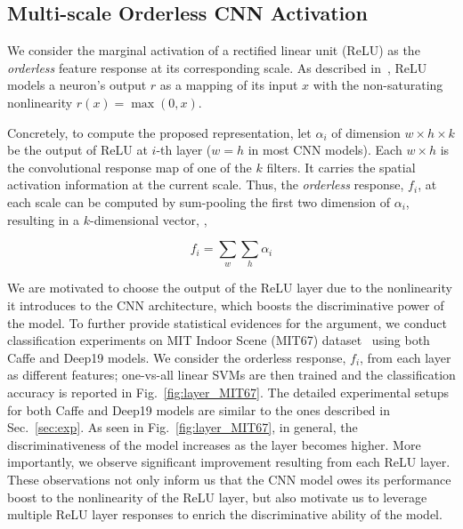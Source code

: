 \documentclass[10pt,twocolumn,letterpaper]{article}
\begin{document}
\subsection{Multi-scale Orderless CNN Activation\label{sec:definition}}

We consider the marginal activation of a rectified linear unit (ReLU) as the \textit{orderless} feature response at its corresponding scale. As described in~\cite{ReLU,AlexNet}, ReLU models a neuron's output $r$ as a mapping of its input $x$ with the non-saturating nonlinearity $r(x)=\max (0,x)$. 

Concretely, to compute the proposed representation, let $\alpha_i$ of dimension $w\times h\times k$ be the output of ReLU at $i$-th layer ($w=h$ in most CNN models). Each $w\times h$ is the convolutional response map of one of the $k$ filters. It carries the spatial activation information at the current scale. Thus, the \textit{orderless} response, $f_i$, at each scale can be computed by sum-pooling the first two dimension of $\alpha_i$, resulting in a $k$-dimensional vector, \ie,

\begin{equation}
f_i=\sum_w \sum_h \alpha_i
\end{equation}

We are motivated to choose the output of the ReLU layer due to the nonlinearity it introduces to the CNN architecture, which boosts the discriminative power of the model. To further provide statistical evidences for the argument, we conduct classification experiments on MIT Indoor Scene (MIT67) dataset~\cite{MIT67} using both Caffe and Deep19 models. We consider the orderless response, $f_i$, from each layer as different features; one-vs-all linear SVMs are then trained and the classification accuracy is reported in Fig.~\ref{fig:layer_MIT67}. The detailed experimental setups for both Caffe and Deep19 models are similar to the ones described in Sec.~\ref{sec:exp}. As seen in Fig.~\ref{fig:layer_MIT67}, in general, the discriminativeness of the model increases as the layer becomes higher. More importantly, we observe significant improvement resulting from each ReLU layer. These observations not only inform us that the CNN model owes its performance boost to the nonlinearity of the ReLU layer, but also motivate us to leverage multiple ReLU layer responses to enrich the discriminative ability of the model. 
\end{document}
